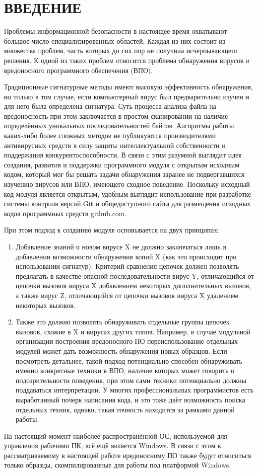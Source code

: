 \section* {ВВЕДЕНИЕ}
Проблемы информационной безопасности в настоящее время охватывают большое число специализированных областей. Каждая из них состоит из множества проблем, часть которых до сих пор не получила исчерпывающего решения. К одной из таких проблем относится проблема обнаружения вирусов и вредоносного программного обеспечения (ВПО).

Традиционные сигнатурные методы имеют высокую эффективность обнаружения, но только в том случае, если компьютерный вирус был предварительно изучен и для него была определена сигнатура\cite {GOSTVIRUS}. Суть процесса анализа файла на вредоносность при этом заключается в простом сканировании на наличие определённых уникальных последовательностей байтов. Алгоритмы работы каких-либо более сложных методов не публикуются производителями антивирусных средств в силу защиты интеллектуальной собственности и  поддержания конкурентоспособности. В связи с этим разумной выглядит идея создания, развития и поддержки программного модуля с открытым исходным кодом, который мог бы решать задачи обнаружения заранее не подвергавшихся изучению вирусов или ВПО, имеющего сходное поведение. Поскольку исходный код модуля является открытым, удобным выглядит использование при разработке системы контроля версий Git и общедоступного сайта для размещения исходных кодов программных средств github.com.

При этом подход к созданию модуля основывается на двух принципах:
\begin {enumerate}
	\item Добавление знаний о новом вирусе X не должно заключаться лишь в добавлении возможности обнаружения копий X (как это происходит при использовании сигнатур). Критерий сравнения цепочек должен позволять предлагать в качестве опасной последовательности вирус Y, отличающийся от цепочки вызовов вируса X добавлением некоторых дополнительных вызовов, а также вирус Z, отличающийся от цепочки вызовов вируса X удалением некоторых вызовов.
	\item Также это должно позволять обнаруживать отдельные группы цепочек вызовов, схожие в X и вирусах других типов. Например, в случае модульной организации построения вредоносного ПО переиспользование отдельных модулей может дать возможность обнаружения новых образцов. Если посмотреть детальнее, такой подход потенциально способен обнаруживать именно конкретные техники в ВПО, наличие которых может говорить о подозрительности поведения, при этом сами техники потенциально должны поддаваться интерпретации. У многих профессиональных программистов есть выработанный почерк написания кода, и это тоже даёт возможность поиска отдельных техник, однако, такая точность находится за рамками данной работы.
\end {enumerate}
На настоящий момент наиболее распространённой ОС, используемой для управления рабочими ПК, всё ещё является Windows. В связи с этим к рассматриваемому в настоящей работе вредоносному ПО также будут относиться только образцы, скомпилированные для работы под платформой Windows.

